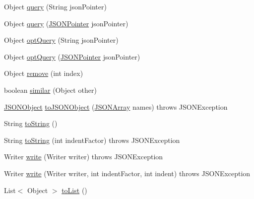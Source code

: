 \begin{DoxyCompactItemize}
\item 
Object \hyperlink{classorg_1_1json_1_1JSONArray_aa8f57cbe8177f2063533e29c5bb4a088}{query} (String json\-Pointer)
\item 
Object \hyperlink{classorg_1_1json_1_1JSONArray_ad27351e4257f89ed920e9aaebf373230}{query} (\hyperlink{classorg_1_1json_1_1JSONPointer}{J\-S\-O\-N\-Pointer} json\-Pointer)
\item 
Object \hyperlink{classorg_1_1json_1_1JSONArray_aec9dce2eaf9f212fc0189983c75fca8e}{opt\-Query} (String json\-Pointer)
\item 
Object \hyperlink{classorg_1_1json_1_1JSONArray_a4cfc1c1790a092f20f68a18c1bf74e5a}{opt\-Query} (\hyperlink{classorg_1_1json_1_1JSONPointer}{J\-S\-O\-N\-Pointer} json\-Pointer)
\item 
Object \hyperlink{classorg_1_1json_1_1JSONArray_ae5a2f41647bb60b10ae23e450a238f86}{remove} (int index)
\item 
boolean \hyperlink{classorg_1_1json_1_1JSONArray_ad65b088479ba456bff099c73d0659ae3}{similar} (Object other)
\item 
\hyperlink{classorg_1_1json_1_1JSONObject}{J\-S\-O\-N\-Object} \hyperlink{classorg_1_1json_1_1JSONArray_a1b4d06dc69a1289bc2920c5780305962}{to\-J\-S\-O\-N\-Object} (\hyperlink{classorg_1_1json_1_1JSONArray}{J\-S\-O\-N\-Array} names)  throws J\-S\-O\-N\-Exception 
\item 
String \hyperlink{classorg_1_1json_1_1JSONArray_afc869e72ec78bf906683ab2f77cdba77}{to\-String} ()
\item 
String \hyperlink{classorg_1_1json_1_1JSONArray_a4f18bcd5cb7b9f2b7c7918c55e0e9b10}{to\-String} (int indent\-Factor)  throws J\-S\-O\-N\-Exception 
\item 
Writer \hyperlink{classorg_1_1json_1_1JSONArray_a28e509c7d8e5606e10a7a321c167aec8}{write} (Writer writer)  throws J\-S\-O\-N\-Exception 
\item 
Writer \hyperlink{classorg_1_1json_1_1JSONArray_a1014b777a9b43800254b256354f79183}{write} (Writer writer, int indent\-Factor, int indent)  throws J\-S\-O\-N\-Exception 
\item 
List$<$ Object $>$ \hyperlink{classorg_1_1json_1_1JSONArray_a331bb92aabf63f192755b85e8f86b25b}{to\-List} ()
\end{DoxyCompactItemize}


